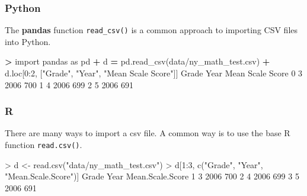 \documentclass[
]{book}
\newenvironment{Shaded}{\begin{snugshade}}{\end{snugshade}}
\newcommand{\DecValTok}[1]{\textcolor[rgb]{0.00,0.00,0.81}{#1}}
\newcommand{\FunctionTok}[1]{\textcolor[rgb]{0.00,0.00,0.00}{#1}}
\newcommand{\ImportTok}[1]{#1}
\newcommand{\NormalTok}[1]{#1}
\newcommand{\OperatorTok}[1]{\textcolor[rgb]{0.81,0.36,0.00}{\textbf{#1}}}
\newcommand{\OtherTok}[1]{\textcolor[rgb]{0.56,0.35,0.01}{#1}}
\newcommand{\SpecialCharTok}[1]{\textcolor[rgb]{0.00,0.00,0.00}{#1}}
\newcommand{\StringTok}[1]{\textcolor[rgb]{0.31,0.60,0.02}{#1}}
\begin{document}
\hypertarget{python-10}{%
\subsubsection*{Python}\label{python-10}}

The \textbf{pandas} function \texttt{read\_csv()} is a common approach to importing CSV files into Python.

\begin{Shaded}
\begin{Highlighting}[]
\OperatorTok{\textgreater{}} \ImportTok{import}\NormalTok{ pandas }\ImportTok{as}\NormalTok{ pd}
\OperatorTok{+}\NormalTok{ d }\OperatorTok{=}\NormalTok{ pd.read\_csv(}\StringTok{\textquotesingle{}data/ny\_math\_test.csv\textquotesingle{}}\NormalTok{)}
\OperatorTok{+}\NormalTok{ d.loc[}\DecValTok{0}\NormalTok{:}\DecValTok{2}\NormalTok{, [}\StringTok{"Grade"}\NormalTok{, }\StringTok{"Year"}\NormalTok{, }\StringTok{"Mean Scale Score"}\NormalTok{]]}
\NormalTok{  Grade  Year  Mean Scale Score}
\DecValTok{0}     \DecValTok{3}  \DecValTok{2006}               \DecValTok{700}
\DecValTok{1}     \DecValTok{4}  \DecValTok{2006}               \DecValTok{699}
\DecValTok{2}     \DecValTok{5}  \DecValTok{2006}               \DecValTok{691}
\end{Highlighting}
\end{Shaded}

\hypertarget{r-10}{%
\subsubsection*{R}\label{r-10}}

There are many ways to import a csv file. A common way is to use the base R function \texttt{read.csv()}.

\begin{Shaded}
\begin{Highlighting}[]
\SpecialCharTok{\textgreater{}}\NormalTok{ d }\OtherTok{\textless{}{-}} \FunctionTok{read.csv}\NormalTok{(}\StringTok{"data/ny\_math\_test.csv"}\NormalTok{)}
\SpecialCharTok{\textgreater{}}\NormalTok{ d[}\DecValTok{1}\SpecialCharTok{:}\DecValTok{3}\NormalTok{, }\FunctionTok{c}\NormalTok{(}\StringTok{"Grade"}\NormalTok{, }\StringTok{"Year"}\NormalTok{, }\StringTok{"Mean.Scale.Score"}\NormalTok{)]}
\NormalTok{  Grade Year Mean.Scale.Score}
\DecValTok{1}     \DecValTok{3} \DecValTok{2006}              \DecValTok{700}
\DecValTok{2}     \DecValTok{4} \DecValTok{2006}              \DecValTok{699}
\DecValTok{3}     \DecValTok{5} \DecValTok{2006}              \DecValTok{691}
\end{Highlighting}
\end{Shaded}
\end{document}
